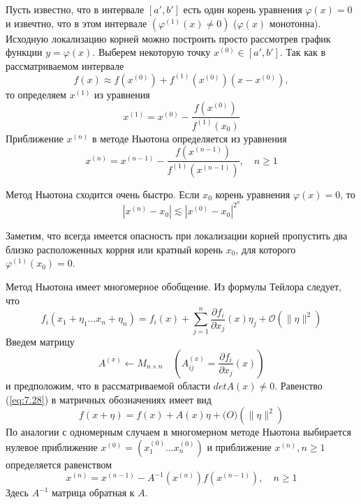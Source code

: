 Пусть известно, что в интервале $[a', b']$ есть один корень уравнения $\varphi(x) = 0$ и извечтно, что в этом интервале $(\varphi^{(1)}(x) \neq 0)$ ($\varphi(x)$ монотонна). Исходную локализацию корней можно построить просто рассмотрев график функции $y = \varphi(x)$. Выберем некоторую точку $x^{(0)} \in [a', b']$. Так как в рассматриваемом интервале 
\begin{equation} \label{eq:7.24}
	f(x) \approx f(x^{(0)}) + f^{(1)}(x^{(0)})(x-x^{(0)}),
\end{equation} 
то определяем $x^{(1)}$ из уравнения
\begin{equation} \label{eq:7.25}
	x^{(1)} = x^{(0)} - \frac{f(x^{(0)})}{f^{(1)}(x_0)}
\end{equation}
Приближение $x^{(n)}$ в методе Ньютона определяется из уравнения
\begin{equation} \label{eq:7.26}
	x^{(n)} = x^{(n-1)} - \frac{f(x^{(n-1)})}{f^{(1)}(x^{(n-1)})}, \quad n \geq 1
\end{equation} 

Метод Ньютона сходится очень быстро. Если $x_0$ корень уравнения $\varphi(x) = 0$, то
\begin{equation} \label{eq:7.27}
	|x^{(n)} - x_0| \lesssim |x^{(0)} - x_0|^{2^n}
\end{equation} 

Заметим, что всегда имеется опасность при локализации корней пропустить два близко расположенных коррня или кратный корень $x_0$, для которого $\varphi^{(1)}(x_0) = 0$.

Метод Ньютона имеет многомерное обобщение. Из формулы Тейлора следует, что 
\begin{equation} \label{eq:7.28}
	f_i(x_1 + \eta_1 \dots x_n + \eta_n) = f_i(x) + \sum^n_{j=1}{\frac{\partial f_i}{\partial x_j}(x) \eta_j + \mathcal{O}(\|\eta\|^2)}
\end{equation} 
Введем матрицу
\begin{equation} \label{eq:7.29}
	A^{(x)} \gets M_{n \times n} \quad (A^{(x)}_{ij} = \frac{\partial f_i}{\partial x_j}(x))
\end{equation} 
и предположим, что в рассматриваемой области $detA(x) \neq 0$. Равенство (\ref{eq:7.28}) в матричных обозначениях имеет вид
\begin{equation} \label{eq:7.30}
	f(x + \eta) = f(x) + A(x)\eta + \mathcal(O)(\|\eta\|^2)
\end{equation} 
По аналогии с одномерным случаем в многомерном методе Ньютона выбирается нулевое приближение $x^{(0)} = (x^{(0)}_1 \dots x^{(0)}_n)$ и приближение $x^{(n)}, n \geq 1$ определяется равенством
\begin{equation} \label{eq:7.31}
	x^{(n)} = x^{(n-1)} - A^{-1}(x^{(n)})f(x^{(n-1)}), \quad n \geq 1
\end{equation} 
Здесь $A^{-1}$ матрица обратная к $A$.
